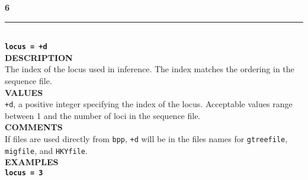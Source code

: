 \documentclass[11pt]{article}
\begin{document}
\noindent\textbf{{\large6}} \\
\noindent\rule{\textwidth}{0.8pt} \\
\textbf{{\Large \texttt{locus = +d}}} \vspace{5pt}\\
\textbf{DESCRIPTION} \vspace{5pt}\\
The index of the locus used in inference. The index matches the ordering in the sequence file. \vspace{5pt}\\
\textbf{VALUES} \vspace{5pt}\\
\texttt{+d}, a positive integer specifying the index of the locus. Acceptable values range between 1 and the number of loci in the sequence file. %
\vspace{5pt}\\
\textbf{COMMENTS} \vspace{5pt}\\
If files are used directly from \texttt{bpp}, \texttt{+d} will be in the files names for \texttt{gtreefile}, \texttt{migfile}, and \texttt{HKYfile}.
\vspace{5pt}\\
\textbf{EXAMPLES} \vspace{5pt}\\
\textbf{\texttt{locus = 3}}\vspace{10pt}\\
\end{document}
